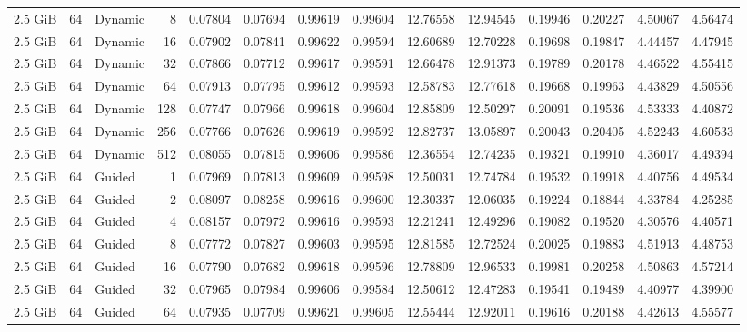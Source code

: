\begin{table}[H]
\begin{adjustbox}{width=\textwidth, keepaspectratio}
\begin{tabular}{rrlrrrrrrrrrrr}
                    2.5 GiB & 64 & Dynamic & 8 & 0.07804 & 0.07694 & 0.99619 & 0.99604 & 12.76558 & 12.94545 & 0.19946 & 0.20227 & 4.50067 & 4.56474 \\
                    2.5 GiB & 64 & Dynamic & 16 & 0.07902 & 0.07841 & 0.99622 & 0.99594 & 12.60689 & 12.70228 & 0.19698 & 0.19847 & 4.44457 & 4.47945 \\
                    2.5 GiB & 64 & Dynamic & 32 & 0.07866 & 0.07712 & 0.99617 & 0.99591 & 12.66478 & 12.91373 & 0.19789 & 0.20178 & 4.46522 & 4.55415 \\
                    2.5 GiB & 64 & Dynamic & 64 & 0.07913 & 0.07795 & 0.99612 & 0.99593 & 12.58783 & 12.77618 & 0.19668 & 0.19963 & 4.43829 & 4.50556 \\
                    2.5 GiB & 64 & Dynamic & 128 & 0.07747 & 0.07966 & 0.99618 & 0.99604 & 12.85809 & 12.50297 & 0.20091 & 0.19536 & 4.53333 & 4.40872 \\
                    2.5 GiB & 64 & Dynamic & 256 & 0.07766 & 0.07626 & 0.99619 & 0.99592 & 12.82737 & 13.05897 & 0.20043 & 0.20405 & 4.52243 & 4.60533 \\
                    2.5 GiB & 64 & Dynamic & 512 & 0.08055 & 0.07815 & 0.99606 & 0.99586 & 12.36554 & 12.74235 & 0.19321 & 0.19910 & 4.36017 & 4.49394 \\
                    2.5 GiB & 64 & Guided & 1 & 0.07969 & 0.07813 & 0.99609 & 0.99598 & 12.50031 & 12.74784 & 0.19532 & 0.19918 & 4.40756 & 4.49534 \\
                    2.5 GiB & 64 & Guided & 2 & 0.08097 & 0.08258 & 0.99616 & 0.99600 & 12.30337 & 12.06035 & 0.19224 & 0.18844 & 4.33784 & 4.25285 \\
                    2.5 GiB & 64 & Guided & 4 & 0.08157 & 0.07972 & 0.99616 & 0.99593 & 12.21241 & 12.49296 & 0.19082 & 0.19520 & 4.30576 & 4.40571 \\
                    2.5 GiB & 64 & Guided & 8 & 0.07772 & 0.07827 & 0.99603 & 0.99595 & 12.81585 & 12.72524 & 0.20025 & 0.19883 & 4.51913 & 4.48753 \\
                    2.5 GiB & 64 & Guided & 16 & 0.07790 & 0.07682 & 0.99618 & 0.99596 & 12.78809 & 12.96533 & 0.19981 & 0.20258 & 4.50863 & 4.57214 \\
                    2.5 GiB & 64 & Guided & 32 & 0.07965 & 0.07984 & 0.99606 & 0.99584 & 12.50612 & 12.47283 & 0.19541 & 0.19489 & 4.40977 & 4.39900 \\
                    2.5 GiB & 64 & Guided & 64 & 0.07935 & 0.07709 & 0.99621 & 0.99605 & 12.55444 & 12.92011 & 0.19616 & 0.20188 & 4.42613 & 4.55577 \\

\end{tabular}
\end{adjustbox}
\end{table}
